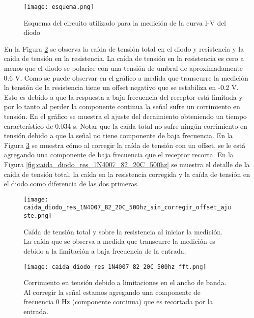 \documentclass[a4paper, 11pt]{article}
\begin{document}
\begin{figure} [H]
\centering
\texttt{[image: esquema.png]}
\caption{Esquema del circuito utilizado para la medición de la curva I-V del diodo \label{fig:esquemadiodo}}
\end{figure} 

En la Figura \ref{fig:caida_diodo_res_1N4007_82_20C_500hz_sin_corregir_offset_ajuste} se observa la caída de tensión total en el diodo y resistencia y la caída de tensión en la resistencia. La caída de tensión en la resistencia es cero a menos que el diodo se polarice con una tensión de umbral de aproximadamente 0.6 V. Como se puede observar en el gráfico a medida que transcurre la medición la tensión de la resistencia tiene un offset negativo que se estabiliza en -0.2 V. Esto es debido a que la respuesta a baja frecuencia del receptor está limitada y por lo tanto al perder la componente continua la señal sufre un corrimiento en tensión. En el gráfico se muestra el ajuste del decaimiento obteniendo un tiempo característico de 0.034 s. Notar que la caída total no sufre ningún corrimiento en tensión debido a que la señal no tiene componente de baja frecuencia. 
En la Figura \ref{fig:caida_diodo_res_1N4007_82_20C_500hz_fft} se muestra cómo al corregir la caída de tensión con un offset, se le está agregando una componente de baja frecuencia que el receptor recorta. En la Figura \ref{fig:caida_diodo_res_1N4007_82_20C_500hz} se muestra el detalle de la caída de tensión total, la caída en la resistencia corregida y la caída de tensión en el diodo como diferencia de las dos primeras.

\begin{figure} [H]
\centering
\texttt{[image: caida\_diodo\_res\_1N4007\_82\_20C\_500hz\_sin\_corregir\_offset\_ajuste.png]}
\caption{Caída de tensión total y sobre la resistencia al iniciar la medición. La caída que se observa a medida que transcurre la medición es debido a la limitación a baja frecuencia de la entrada. \label{fig:caida_diodo_res_1N4007_82_20C_500hz_sin_corregir_offset_ajuste}}
\end{figure} 

\begin{figure} [H]
\centering
\texttt{[image: caida\_diodo\_res\_1N4007\_82\_20C\_500hz\_fft.png]}
\caption{Corrimiento en tensión debido a limitaciones en el ancho de banda. Al corregir la señal estamos agregando una componente de frecuencia 0 Hz (componente continua) que es recortada por la entrada. \label{fig:caida_diodo_res_1N4007_82_20C_500hz_fft}}
\end{figure} 
\end{document}
